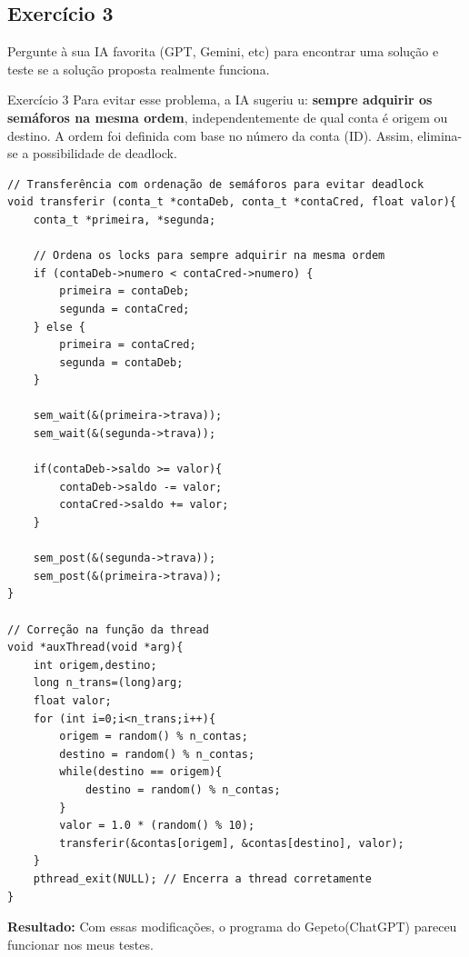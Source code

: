 \documentclass[14pt,a4paper]{article}
\begin{document}
\subsection*{Exercício 3}
Pergunte à sua IA favorita (GPT, Gemini, etc) para encontrar uma solução e teste se a solução proposta realmente funciona.

\begin{solucao}{Exercício 3}{}
Para evitar esse problema, a IA sugeriu u: \textbf{sempre adquirir os semáforos na mesma ordem}, independentemente de qual conta é origem ou destino. A ordem foi definida com base no número da conta (ID). Assim, elimina-se a possibilidade de deadlock.

\begin{verbatim}
// Transferência com ordenação de semáforos para evitar deadlock
void transferir (conta_t *contaDeb, conta_t *contaCred, float valor){
    conta_t *primeira, *segunda;

    // Ordena os locks para sempre adquirir na mesma ordem
    if (contaDeb->numero < contaCred->numero) {
        primeira = contaDeb;
        segunda = contaCred;
    } else {
        primeira = contaCred;
        segunda = contaDeb;
    }

    sem_wait(&(primeira->trava));
    sem_wait(&(segunda->trava));

    if(contaDeb->saldo >= valor){
        contaDeb->saldo -= valor;
        contaCred->saldo += valor;
    }

    sem_post(&(segunda->trava));
    sem_post(&(primeira->trava));
}

// Correção na função da thread
void *auxThread(void *arg){
    int origem,destino;
    long n_trans=(long)arg;
    float valor;
    for (int i=0;i<n_trans;i++){
        origem = random() % n_contas;
        destino = random() % n_contas;
        while(destino == origem){
            destino = random() % n_contas;
        }
        valor = 1.0 * (random() % 10);
        transferir(&contas[origem], &contas[destino], valor);
    }
    pthread_exit(NULL); // Encerra a thread corretamente
}
\end{verbatim}

\textbf{Resultado:} Com essas modificações, o programa do Gepeto(ChatGPT) pareceu funcionar nos meus testes.
\end{solucao}
\end{document}
